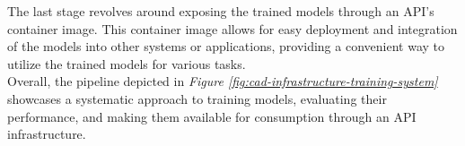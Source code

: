 The last stage revolves around exposing the trained models through an API's container image. This container image allows for easy deployment and integration of the models into other systems or applications, providing a convenient way to utilize the trained models for various tasks. \\

Overall, the pipeline depicted in \textit{Figure \ref{fig:cad-infrastructure-training-system}} showcases a systematic approach to training models, evaluating their performance, and making them available for consumption through an API infrastructure.



    

